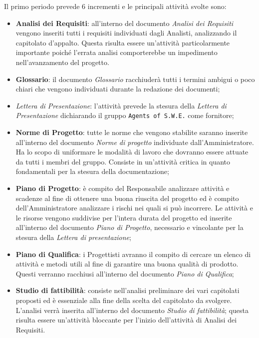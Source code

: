 Il primo periodo prevede 6 incrementi e le principali attività svolte sono: 
\begin{itemize}
	\item \textbf{Analisi dei Requisiti}: all'interno del documento \textit{Analisi dei Requisiti} vengono inseriti tutti i requisiti individuati dagli Analisti, analizzando il capitolato d'appalto. Questa risulta essere un'attività particolarmente importante poiché l'errata analisi comporterebbe un impedimento nell'avanzamento del progetto.
	\item \textbf{Glossario}: il documento \textit{Glossario} racchiuderà tutti i termini ambigui o poco chiari che vengono individuati durante la redazione dei documenti;
	\item \textit{Lettera di Presentazione}: l'attività prevede la stesura della \textit{Lettera di Presentazione} dichiarando il gruppo \texttt{Agents of S.W.E.} come fornitore;
	\item \textbf{Norme di Progetto}: tutte le norme che vengono stabilite saranno inserite all'interno del documento \textit{Norme di progetto} individuate dall'Amministratore. Ha lo scopo di uniformare le modalità di lavoro che dovranno essere attuate da tutti i membri del gruppo. Consiste in un'attività critica in quanto fondamentali per la stesura della documentazione;
	\item \textbf{Piano di Progetto}: è compito del Responsabile analizzare attività e scadenze al fine di ottenere una buona riuscita del progetto ed è compito dell'Amministratore analizzare i rischi nei quali si può incorrere. Le attività e le risorse vengono suddivise per l'intera durata del progetto ed inserite all'interno del documento \textit{Piano di Progetto}, necessario e vincolante per la stesura della \textit{Lettera di presentazione};
	\item \textbf{Piano di Qualifica}: i Progettisti avranno il compito di cercare un elenco di attività e metodi utili al fine di garantire una buona qualità di prodotto. Questi verranno racchiusi all'interno del documento \textit{Piano di Qualifica};
	\item \textbf{Studio di fattibilità}: consiste nell'analisi preliminare dei vari capitolati proposti ed è essenziale alla fine della scelta del capitolato da svolgere. L'analisi verrà inserita all'interno del documento \textit{Studio di fattibilità}; questa risulta essere un'attività bloccante per l'inizio dell'attività di Analisi dei Requisiti.  
\end{itemize}